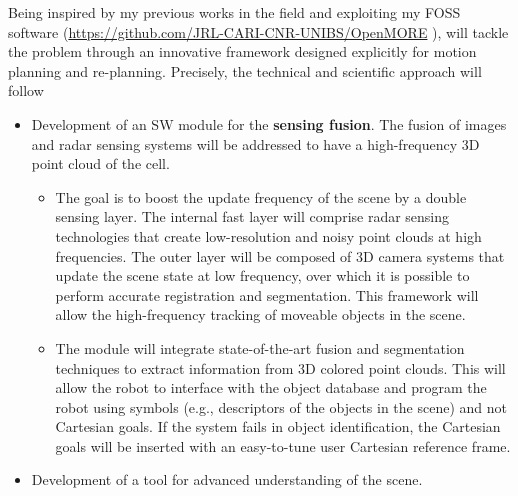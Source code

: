Being inspired by my previous works in the field and exploiting my FOSS
software (\url{https://github.com/JRL-CARI-CNR-UNIBS/OpenMORE} ),
 will tackle the problem through an innovative
framework designed explicitly for motion planning and re-planning.
Precisely, the technical and scientific approach will follow

\begin{itemize}[arrow]
\item
  Development of an SW module for the \textbf{sensing fusion}. The
  fusion of images and radar sensing systems will be addressed to have a
  high-frequency 3D point cloud of the cell.

  \begin{itemize}
  \item
    The goal is to boost the update frequency of the scene by a double
    sensing layer. The internal fast layer will comprise radar sensing
    technologies that create low-resolution and noisy point clouds at
    high frequencies. The outer layer will be composed of 3D camera
    systems that update the scene state at low frequency, over which it
    is possible to perform accurate registration and segmentation. This
    framework will allow the high-frequency tracking of moveable objects
    in the scene.
  \item
    The module will integrate state-of-the-art fusion and segmentation
    techniques to extract information from 3D colored point clouds. This
    will allow the robot to interface with the object database and
    program the robot using symbols (e.g., descriptors of the objects in
    the scene) and not Cartesian goals. If the system fails in object
    identification, the Cartesian goals will be inserted with an
    easy-to-tune user Cartesian reference frame.
  \end{itemize}
\item
  Development of a tool for advanced understanding of the scene.


\end{itemize}
